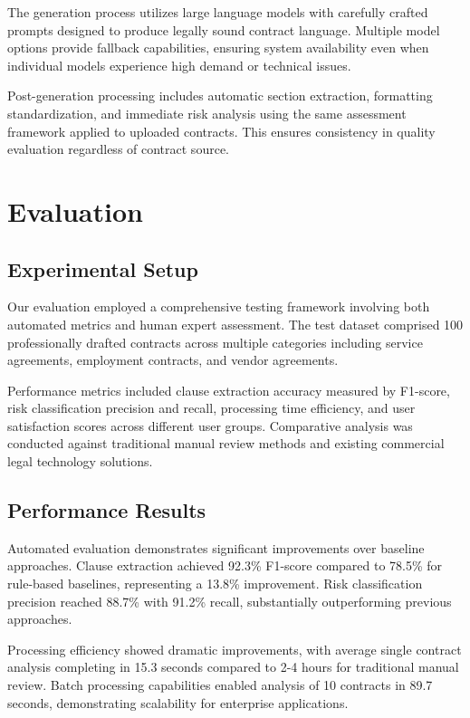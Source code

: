 \documentclass[conference]{IEEEtran}
\begin{document}
The generation process utilizes large language models with carefully crafted prompts designed to produce legally sound contract language. Multiple model options provide fallback capabilities, ensuring system availability even when individual models experience high demand or technical issues.

Post-generation processing includes automatic section extraction, formatting standardization, and immediate risk analysis using the same assessment framework applied to uploaded contracts. This ensures consistency in quality evaluation regardless of contract source.

\section{Evaluation}

\subsection{Experimental Setup}

Our evaluation employed a comprehensive testing framework involving both automated metrics and human expert assessment. The test dataset comprised 100 professionally drafted contracts across multiple categories including service agreements, employment contracts, and vendor agreements.

Performance metrics included clause extraction accuracy measured by F1-score, risk classification precision and recall, processing time efficiency, and user satisfaction scores across different user groups. Comparative analysis was conducted against traditional manual review methods and existing commercial legal technology solutions.

\subsection{Performance Results}

Automated evaluation demonstrates significant improvements over baseline approaches. Clause extraction achieved 92.3\% F1-score compared to 78.5\% for rule-based baselines, representing a 13.8\% improvement. Risk classification precision reached 88.7\% with 91.2\% recall, substantially outperforming previous approaches.

Processing efficiency showed dramatic improvements, with average single contract analysis completing in 15.3 seconds compared to 2-4 hours for traditional manual review. Batch processing capabilities enabled analysis of 10 contracts in 89.7 seconds, demonstrating scalability for enterprise applications.
\end{document}
